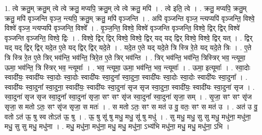 \documentclass[17pt]{extarticle}
\begin{document}
1. त्वे क्रतु॒म् क्रतु॒म् त्वे त्वे क्रतु॒ मप्यपि॒ क्रतु॒म् त्वे त्वे क्रतु॒ मपि॑ । . त्वे इति॒ त्वे । . क्रतु॒ मप्यपि॒ क्रतु॒म् क्रतु॒ मपि॑ वृञ्जन्ति वृञ्ज॒ न्त्यपि॒ क्रतु॒म् क्रतु॒ मपि॑ वृञ्जन्ति । . अपि॑ वृञ्जन्ति वृञ्ज॒ न्त्यप्यपि॑ वृञ्जन्ति॒ विश्वे॒ विश्वे॑ वृञ्ज॒ न्त्यप्यपि॑ वृञ्जन्ति॒ विश्वे᳚ । . वृ॒ञ्ज॒न्ति॒ विश्वे॒ विश्वे॑ वृञ्जन्ति वृञ्जन्ति॒ विश्वे॒ द्विर् द्विर् विश्वे॑ वृञ्जन्ति वृञ्जन्ति॒ विश्वे॒ द्विः । . विश्वे॒ द्विर् द्विर् विश्वे॒ विश्वे॒ द्विर् यद् यद् द्विर् विश्वे॒ विश्वे॒ द्विर् यत् । . द्विर् यद् यद् द्विर् द्विर् यदे॒त ए॒ते यद् द्विर् द्विर् यदे॒ते । . यदे॒त ए॒ते यद् यदे॒ते त्रि स्त्रि रे॒ते यद् यदे॒ते त्रिः । . ए॒ते त्रि स्त्रि रे॒त ए॒ते त्रिर् भव॑न्ति॒ भव॑न्ति॒ त्रिरे॒त ए॒ते त्रिर् भव॑न्ति । . त्रिर् भव॑न्ति॒ भव॑न्ति॒ त्रिस्त्रिर् भव॒ न्त्यूमा॒ ऊमा॒ भव॑न्ति॒ त्रि स्त्रिर् भव॒ न्त्यूमाः᳚ । . भव॒ न्त्यूमा॒ ऊमा॒ भव॑न्ति॒ भव॒ न्त्यूमाः᳚ । . ऊमा॒ इत्यूमाः᳚ । . स्वा॒दोः स्वादी॑यः॒ स्वादी॑यः स्वा॒दोः स्वा॒दोः स्वादी॑यः स्वा॒दुना᳚ स्वा॒दुना॒ स्वादी॑यः स्वा॒दोः स्वा॒दोः स्वादी॑यः स्वा॒दुना᳚ । . स्वादी॑यः स्वा॒दुना᳚ स्वा॒दुना॒ स्वादी॑यः॒ स्वादी॑यः स्वा॒दुना॑ सृज सृज स्वा॒दुना॒ स्वादी॑यः॒ स्वादी॑यः स्वा॒दुना॑ सृज । . स्वा॒दुना॑ सृज सृज स्वा॒दुना᳚ स्वा॒दुना॑ सृजा॒ सꣳ सꣳ सृ॑ज स्वा॒दुना᳚ स्वा॒दुना॑ सृजा॒ सम् । . सृ॒जा॒ सꣳ सꣳ सृ॑ज सृजा॒ स मतो ऽतः॒ सꣳ सृ॑ज सृजा॒ स मतः॑ । . स मतो ऽतः॒ सꣳ स मत॑ उ वु॒ वतः॒ सꣳ स मत॑ उ । . अत॑ उ वु॒ वतो ऽत॑ ऊ॒ षु स्व तोऽत॑ ऊ॒ षु । . ऊ॒ षु सू॑ षु मधु॒ मधु॒ सू॑ षु मधु॑ । . सु मधु॒ मधु॒ सु सु मधु॒ मधु॑ना॒ मधु॑ना॒ मधु॒ सु सु मधु॒ मधु॑ना । . मधु॒ मधु॑ना॒ मधु॑ना॒ मधु॒ मधु॒ मधु॑ना॒ ऽभ्य॑भि मधु॑ना॒ मधु॒ मधु॒ मधु॑ना॒ ऽभि । \newline
\end{document}
